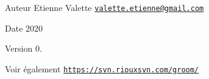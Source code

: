 \begin{DoxyAuthor}{Auteur}
Etienne Valette \href{mailto:valette.etienne@gmail.com}{\tt valette.\+etienne@gmail.\+com} 
\end{DoxyAuthor}
\begin{DoxyDate}{Date}
2020 
\end{DoxyDate}
\begin{DoxyVersion}{Version}
0. 
\end{DoxyVersion}
\begin{DoxySeeAlso}{Voir également}
\href{https://svn.riouxsvn.com/groom/}{\tt https\+://svn.\+riouxsvn.\+com/groom/} 
\end{DoxySeeAlso}
